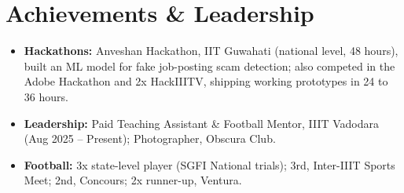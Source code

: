 \documentclass[10pt,a4paper]{article}
\begin{document}
\section{Achievements \& Leadership}
\begin{itemize}
  \item \textbf{Hackathons:} Anveshan Hackathon, IIT Guwahati (national level, 48 hours), built an ML model for fake job-posting scam detection; also competed in the Adobe Hackathon and 2x HackIIITV, shipping working prototypes in 24 to 36 hours.
  \item \textbf{Leadership:} Paid Teaching Assistant \& Football Mentor, IIIT Vadodara (Aug 2025 -- Present); Photographer, Obscura Club.
  \item \textbf{Football:} 3x state-level player (SGFI National trials); 3rd, Inter-IIIT Sports Meet; 2nd, Concours; 2x runner-up, Ventura.
\end{itemize}
\end{document}
